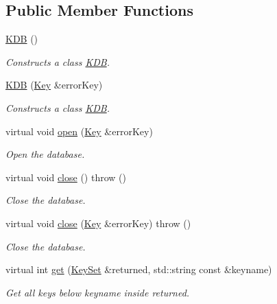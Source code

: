 \subsection*{Public Member Functions}
\begin{DoxyCompactItemize}
\item 
\mbox{\hyperlink{classkdb_1_1KDB_a7e0637995ce9f294cdbc6f167df6db40}{K\+DB}} ()
\begin{DoxyCompactList}\small\item\em Constructs a class \mbox{\hyperlink{classkdb_1_1KDB}{K\+DB}}. \end{DoxyCompactList}\item 
\mbox{\hyperlink{classkdb_1_1KDB_a98e25c7fe2f47c5a90461676c6d219e7}{K\+DB}} (\mbox{\hyperlink{classkdb_1_1Key}{Key}} \&error\+Key)
\begin{DoxyCompactList}\small\item\em Constructs a class \mbox{\hyperlink{classkdb_1_1KDB}{K\+DB}}. \end{DoxyCompactList}\item 
virtual void \mbox{\hyperlink{classkdb_1_1KDB_aee37484b06164eacc0cc11b7b40ab892}{open}} (\mbox{\hyperlink{classkdb_1_1Key}{Key}} \&error\+Key)
\begin{DoxyCompactList}\small\item\em Open the database. \end{DoxyCompactList}\item 
virtual void \mbox{\hyperlink{classkdb_1_1KDB_a1b3ff4a68c2c935d67dce843bc4ad01b}{close}} ()  throw ()
\begin{DoxyCompactList}\small\item\em Close the database. \end{DoxyCompactList}\item 
virtual void \mbox{\hyperlink{classkdb_1_1KDB_aa027a8f798a2cfee11ff712eb204c35d}{close}} (\mbox{\hyperlink{classkdb_1_1Key}{Key}} \&error\+Key)  throw ()
\begin{DoxyCompactList}\small\item\em Close the database. \end{DoxyCompactList}\item 
virtual int \mbox{\hyperlink{classkdb_1_1KDB_a0419ffbc273c89756bc523b4223ec25a}{get}} (\mbox{\hyperlink{classkdb_1_1KeySet}{Key\+Set}} \&returned, std\+::string const \&keyname)
\begin{DoxyCompactList}\small\item\em Get all keys below keyname inside returned. \end{DoxyCompactList}\item 

\end{DoxyCompactItemize}
